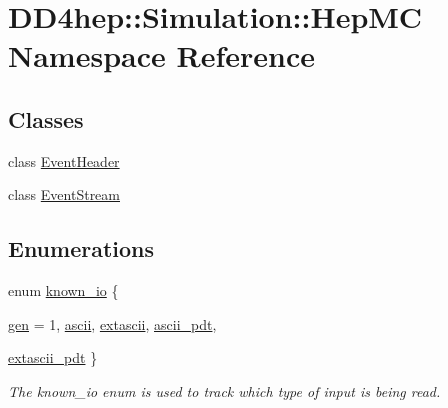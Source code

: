 \hypertarget{namespace_d_d4hep_1_1_simulation_1_1_hep_m_c}{
\section{DD4hep::Simulation::HepMC Namespace Reference}
\label{namespace_d_d4hep_1_1_simulation_1_1_hep_m_c}
}
\subsection*{Classes}
\begin{DoxyCompactItemize}
\item 
class \hyperlink{class_d_d4hep_1_1_simulation_1_1_hep_m_c_1_1_event_header}{EventHeader}
\item 
class \hyperlink{class_d_d4hep_1_1_simulation_1_1_hep_m_c_1_1_event_stream}{EventStream}
\end{DoxyCompactItemize}
\subsection*{Enumerations}
\begin{DoxyCompactItemize}
\item 
enum \hyperlink{namespace_d_d4hep_1_1_simulation_1_1_hep_m_c_abd57f9534b4e3e74fa2e5f25525d452c}{known\_\-io} \{ \par
\hyperlink{namespace_d_d4hep_1_1_simulation_1_1_hep_m_c_abd57f9534b4e3e74fa2e5f25525d452ca1851fc44abe80e919efb31e16f25abae}{gen} = 1, 
\hyperlink{namespace_d_d4hep_1_1_simulation_1_1_hep_m_c_abd57f9534b4e3e74fa2e5f25525d452caa170d10707fb62bbdffdc5e2a65834fd}{ascii}, 
\hyperlink{namespace_d_d4hep_1_1_simulation_1_1_hep_m_c_abd57f9534b4e3e74fa2e5f25525d452ca35d3a404a7b5dcdd485900294bbba4cc}{extascii}, 
\hyperlink{namespace_d_d4hep_1_1_simulation_1_1_hep_m_c_abd57f9534b4e3e74fa2e5f25525d452ca17b19f25d74815dc415a5fde0f894f2d}{ascii\_\-pdt}, 
\par
\hyperlink{namespace_d_d4hep_1_1_simulation_1_1_hep_m_c_abd57f9534b4e3e74fa2e5f25525d452ca951f0ef82695d1e0a1353c5237a3dbcc}{extascii\_\-pdt}
 \}
\begin{DoxyCompactList}\small\item\em The known\_\-io enum is used to track which type of input is being read. \item\end{DoxyCompactList}\end{DoxyCompactItemize}
